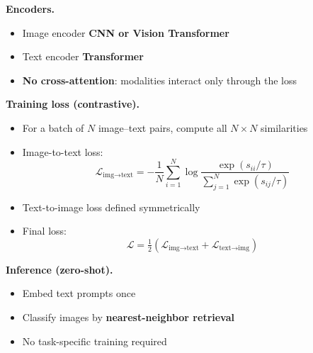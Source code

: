 \textbf{Encoders.}
\begin{itemize}
    \item Image encoder \textbf{CNN or Vision Transformer}
    \item Text encoder \textbf{Transformer}
    \item \textbf{No cross-attention}: modalities interact only through the loss
\end{itemize}

\textbf{Training loss (contrastive).}
\begin{itemize}
    \item For a batch of \(N\) image--text pairs, compute all \(N \times N\) similarities
    \item Image-to-text loss:
    \[
    \mathcal{L}_{\text{img}\rightarrow\text{text}}
    = - \frac{1}{N} \sum_{i=1}^N
    \log \frac{\exp(s_{ii}/\tau)}{\sum_{j=1}^N \exp(s_{ij}/\tau)}
    \]
    \item Text-to-image loss defined symmetrically
    \item Final loss:
    \[
    \mathcal{L}
    = \tfrac{1}{2}
    \left(
    \mathcal{L}_{\text{img}\rightarrow\text{text}}
    +
    \mathcal{L}_{\text{text}\rightarrow\text{img}}
    \right)
    \]
\end{itemize}

\textbf{Inference (zero-shot).}
\begin{itemize}
    \item Embed text prompts once
    \item Classify images by \textbf{nearest-neighbor retrieval}
    \item No task-specific training required
\end{itemize}
